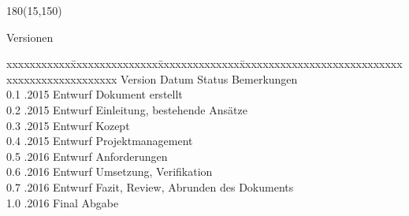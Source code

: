 
\begin{textblock}{180}(15,150)
\color{black}
\begin{huge}
Versionen
\end{huge}


\vspace{10mm}

\fontsize{10pt}{18pt}\selectfont
\begin{tabbing}
xxxxxxxxxxx\=xxxxxxxxxxxxxxx\=xxxxxxxxxxxxxx\=xxxxxxxxxxxxxxxxxxxxxxxxxxxxxxxxxxxxxxxxxxxxxxx \kill
Version	\> Datum	\> Status		\> Bemerkungen		\\
0.1	.2015	\> Entwurf		\> Dokument erstellt	\\	
0.2	.2015	\> Entwurf		\> Einleitung, bestehende Ansätze \\	
0.3	.2015	\> Entwurf		\> Kozept\\	
0.4	.2015	\> Entwurf		\> Projektmanagement	\\	
0.5	.2016	\> Entwurf		\> Anforderungen \\	
0.6	.2016	\> Entwurf		\> Umsetzung, Verifikation\\
0.7	.2016	\> Entwurf		\> Fazit, Review, Abrunden des Dokuments\\
1.0	.2016	\> Final		    \> Abgabe\\
\end{tabbing}

\end{textblock}


